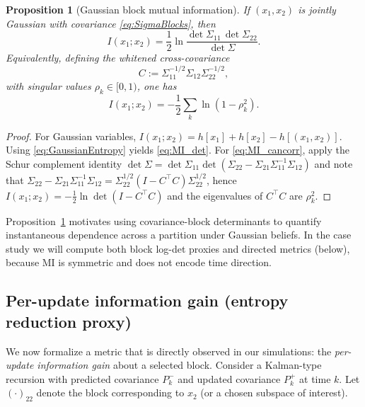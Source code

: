 \documentclass[final,5p,times,twocolumn]{elsarticle}
\newtheorem{proposition}{Proposition}
\begin{document}
\begin{proposition}[Gaussian block mutual information]
	\label{prop:MI_det}
	If $(x_1,x_2)$ is jointly Gaussian with covariance \eqref{eq:SigmaBlocks}, then
	\begin{equation}
		I(x_1;x_2)=\frac{1}{2}\ln\frac{\det\Sigma_{11}\,\det\Sigma_{22}}{\det\Sigma}.
		\label{eq:MI_det}
	\end{equation}
	Equivalently, defining the whitened cross-covariance
	\begin{equation}
		C:=\Sigma_{11}^{-1/2}\Sigma_{12}\Sigma_{22}^{-1/2},
		\label{eq:whitenedC}
	\end{equation}
	with singular values $\rho_k\in[0,1)$, one has
	\begin{equation}
		I(x_1;x_2)=-\frac{1}{2}\sum_k \ln(1-\rho_k^2).
		\label{eq:MI_cancorr}
	\end{equation}
\end{proposition}

\begin{proof}
	For Gaussian variables, $I(x_1;x_2)=h[x_1]+h[x_2]-h[(x_1,x_2)]$. Using \eqref{eq:GaussianEntropy} yields \eqref{eq:MI_det}. For \eqref{eq:MI_cancorr}, apply the Schur complement identity
	$\det\Sigma=\det\Sigma_{11}\det(\Sigma_{22}-\Sigma_{21}\Sigma_{11}^{-1}\Sigma_{12})$
	and note that
	$\Sigma_{22}-\Sigma_{21}\Sigma_{11}^{-1}\Sigma_{12}=\Sigma_{22}^{1/2}(I-C^\top C)\Sigma_{22}^{1/2}$,
	hence $I(x_1;x_2)=-\frac{1}{2}\ln\det(I-C^\top C)$ and the eigenvalues of $C^\top C$ are $\rho_k^2$.
\end{proof}

Proposition~\ref{prop:MI_det} motivates using covariance-block determinants to quantify instantaneous dependence across a partition under Gaussian beliefs. In the case study we will compute both block log-det proxies and directed metrics (below), because MI is symmetric and does not encode time direction.

\subsection{Per-update information gain (entropy reduction proxy)}

We now formalize a metric that is directly observed in our simulations: the \emph{per-update information gain} about a selected block. Consider a Kalman-type recursion with predicted covariance $P_k^-$ and updated covariance $P_k^+$ at time $k$. Let $(\cdot)_{22}$ denote the block corresponding to $x_2$ (or a chosen subspace of interest).
\end{document}
